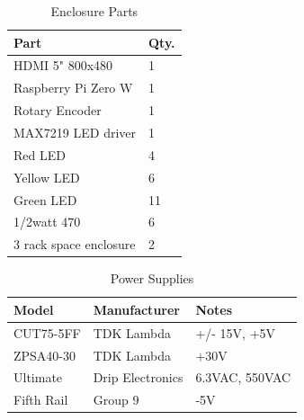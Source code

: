 \documentclass[journal]{IEEEtran}
\begin{document}
	\begin{table}[]
		\centering
		\caption{Enclosure Parts}
		\label{tab:enclosure}
		\begin{tabular}{l|l}
			Part                               & Qty. \\ \hline
			HDMI 5" 800x480    & 1  \\
			Raspberry Pi Zero W    & 1  \\
			Rotary Encoder     & 1  \\
			MAX7219 LED driver & 1  \\
			Red LED            & 4  \\
			Yellow LED         & 6  \\
			Green LED          & 11 \\
			1/2watt 470        & 6  \\
			3 rack space enclosure & 2
		\end{tabular}
	\end{table}


	\begin{table}[]
		\centering
		\caption{Power Supplies}
		\label{tab:powerSupplies}
		\begin{tabular}{l|l|l}

			Model     & Manufacturer     & Notes          \\\hline
			CUT75-5FF & TDK Lambda       & +/- 15V, +5V    \\
			ZPSA40-30 & TDK Lambda       & +30V           \\
			Ultimate  & Drip Electronics & 6.3VAC, 550VAC \\
			Fifth Rail  & Group 9 & -5V
		\end{tabular}
	\end{table}


	

	
	\ifCLASSOPTIONcaptionsoff
	\newpage
	\fi
	
	
	
	
	
\end{document}
